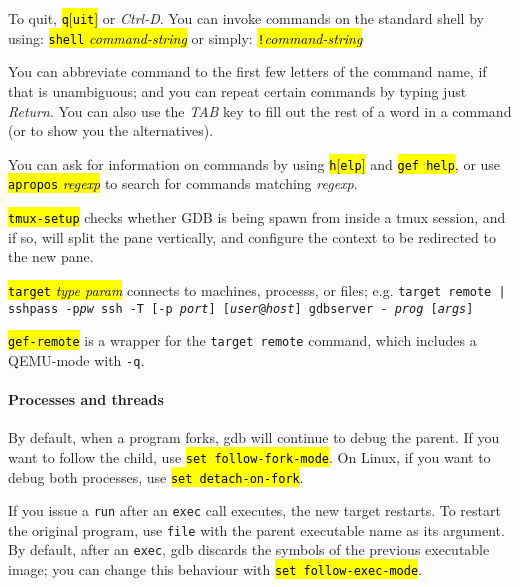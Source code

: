 \documentclass[a4paper,landscape]{article}
\newcommand{\hlc}[2][yellow]{{\sethlcolor{#1} \hl{#2}}}
\newcommand{\gef}[1]{\hlc[skyblue]{#1}}
\begin{document}
\begin{multicols*}{3}
To quit, \hl{\texttt{q}[\texttt{uit}]} or \textit{Ctrl-D}.  
You can invoke commands on the standard shell by using:
\hl{\texttt{shell}\textit{ command-string}}
or simply: \hl{\texttt{!}\textit{command-string}}

You can abbreviate command to the first few letters of the command name, if that
is unambiguous; and you can repeat certain commands by typing just
\textit{Return}. You can also use the \textit{TAB} key to fill out the rest of a word in a command (or to show you the alternatives).

You can ask for information on commands by using \hl{\texttt{h}[\texttt{elp}]} and \gef{\texttt{gef help}},
or use \hl{\texttt{apropos} \textit{regexp}} to search for commands matching \textit{regexp}.

\gef{\texttt{tmux-setup}} checks whether GDB is being spawn from inside a tmux session, and if so, will split the pane vertically, and configure the context to be redirected to the new pane.

\hl{\texttt{target} \textit{type param}} connects to machines, processs, or files; e.g.
\texttt{target remote | sshpass -p\textit{pw} ssh -T [\texttt{-p} \textit{port}] [\textit{user}\texttt{@}\textit{host}] gdbserver - \textit{prog} [\textit{args}]}

\gef{\texttt{gef-remote}} is a wrapper for the \texttt{target remote} command,
which includes a QEMU-mode with \texttt{-q}.

\paragraph{Processes and threads}
By default, when a program forks, gdb will continue to debug the parent.
If you want to follow the child, use \hl{\texttt{set follow-fork-mode}}.
On Linux, if you want to debug both processes, use
\hl{\texttt{set detach-on-fork}}.

If you issue a \texttt{run} after an \texttt{exec} call executes, the new target restarts.
To restart the original program, use \texttt{file} with the parent executable name
as its argument. By default, after an \texttt{exec}, gdb discards the symbols of the
previous executable image; you can change this behaviour with \hl{\texttt{set follow-exec-mode}}.



\end{multicols*}
\end{document}
